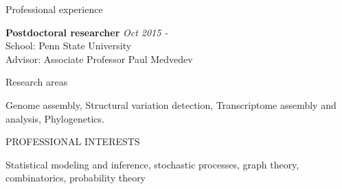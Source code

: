 \documentclass{resume} %
\begin{document}
\begin{rSection}{Professional experience}

{\bf Postdoctoral researcher} \hfill {\em Oct 2015 - } \\ 
School: Penn State University \\
Advisor: Associate Professor Paul Medvedev
\end{rSection}



\begin{rSection}{Research areas}

Genome assembly, Structural variation detection, Transcriptome assembly and analysis, Phylogenetics. 

\end{rSection}


\begin{rSection}{PROFESSIONAL INTERESTS}

Statistical modeling and inference, stochastic processes, graph theory, combinatorics, probability theory

\end{rSection}


\end{document}
